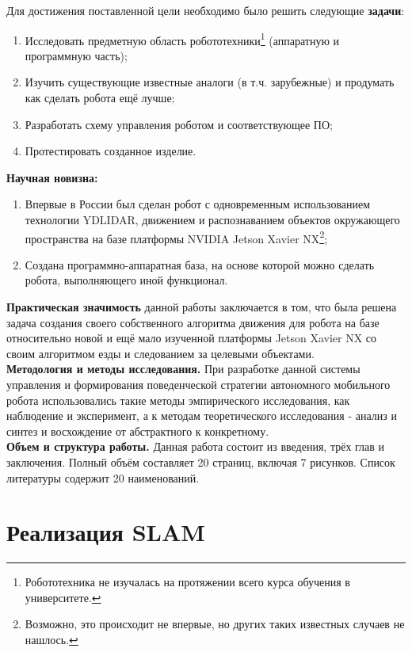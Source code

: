 \documentclass[12pt,a4paper]{scrartcl}
\begin{document}
			Для достижения поставленной цели необходимо было решить следующие \textbf{задачи}:
			\begin{enumerate}
				\item Исследовать предметную область робототехники\footnote{Робототехника не изучалась на протяжении всего курса обучения в университете.} (аппаратную и программную часть);
				\item Изучить существующие известные аналоги (в т.ч. зарубежные) и продумать как сделать робота ещё лучше;
				\item Разработать схему управления роботом и соответствующее ПО;
				\item Протестировать созданное изделие.
			\end{enumerate}
			
			\textbf{Научная новизна:}
			\begin{enumerate}
				\item Впервые в России был сделан робот с одновременным использованием технологии YDLIDAR, движением и распознаванием объектов окружающего пространства на базе платформы NVIDIA Jetson Xavier NX\footnote{Возможно, это происходит не впервые, но других таких известных случаев не нашлось.};
				\item Создана программно-аппаратная база, на основе которой можно сделать робота, выполняющего иной функционал.
			\end{enumerate}
			
			\textbf{Практическая значимость} данной работы заключается в том, что была решена задача создания своего собственного алгоритма движения для робота на базе относительно новой и ещё мало изученной платформы Jetson Xavier NX со своим алгоритмом езды и следованием за целевыми объектами. \\ 
			
			\textbf{Методология и методы исследования.} При разработке данной системы управления и формирования поведенческой стратегии автономного мобильного робота использовались такие методы эмпирического исследования, как наблюдение и эксперимент, а к методам теоретического исследования - анализ и синтез и восхождение от абстрактного к конкретному. \\
			
			\textbf{Объем и структура работы.} Данная работа состоит из введения, трёх глав и заключения. Полный объём составляет 20 страниц, включая 7 рисунков. Список литературы содержит 20 наименований. \\
			
		\section{Реализация SLAM} \label{sec:slam}
\end{document}
